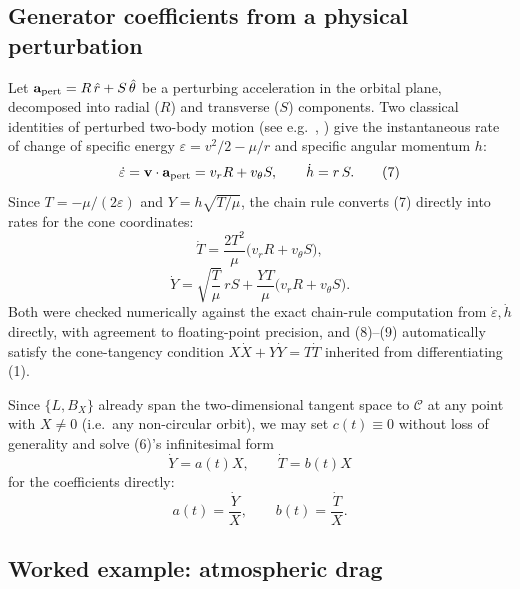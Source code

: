 \documentclass[11pt]{amsart}
\begin{document}
\subsection{Generator coefficients from a physical perturbation}

Let $\mathbf a_{\rm pert}=R\,\hat r+S\,\hat\theta$ be a perturbing acceleration in the orbital plane, decomposed into radial ($R$) and transverse ($S$) components. Two classical identities of perturbed two-body motion (see e.g.\ \cite{Vallado2013}, \cite{KingHele1964}) give the instantaneous rate of change of specific energy $\varepsilon=v^2/2-\mu/r$ and specific angular momentum $h$:
\begin{equation}
\dot\varepsilon=\mathbf v\cdot\mathbf a_{\rm pert}=v_rR+v_\theta S,\qquad \dot h = r\,S. \tag{7}
\end{equation}
Since $T=-\mu/(2\varepsilon)$ and $Y=h\sqrt{T/\mu}$, the chain rule converts (7) directly into rates for the cone coordinates:
\begin{equation}
\dot T=\frac{2T^2}{\mu}\big(v_rR+v_\theta S\big), \tag{8}
\end{equation}
\begin{equation}
\dot Y=\sqrt{\frac{T}{\mu}}\,rS+\frac{YT}{\mu}\big(v_rR+v_\theta S\big). \tag{9}
\end{equation}
Both were checked numerically against the exact chain-rule computation from $\dot\varepsilon,\dot h$ directly, with agreement to floating-point precision, and (8)--(9) automatically satisfy the cone-tangency condition $X\dot X+Y\dot Y=T\dot T$ inherited from differentiating (1).

Since $\{L,B_X\}$ already span the two-dimensional tangent space to $\mathcal C$ at any point with $X\ne0$ (i.e.\ any non-circular orbit), we may set $c(t)\equiv0$ without loss of generality and solve (6)'s infinitesimal form
\[
\dot Y=a(t)X,\qquad \dot T=b(t)X
\]
for the coefficients directly:
\begin{equation}
a(t)=\frac{\dot Y}{X},\qquad b(t)=\frac{\dot T}{X}. \tag{10}
\end{equation}

\subsection{Worked example: atmospheric drag}
\end{document}
